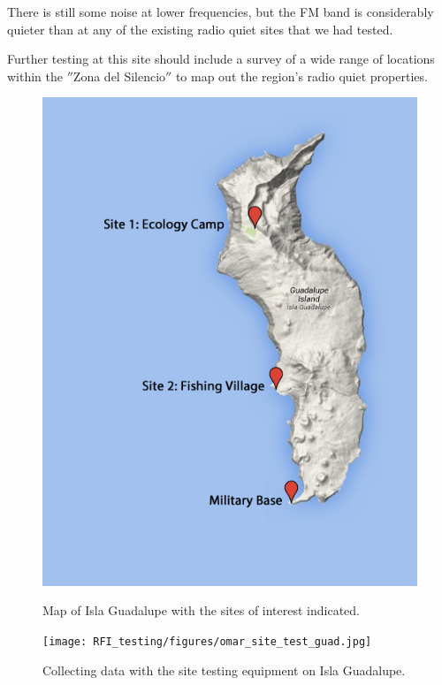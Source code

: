 There is still some noise at lower frequencies, but the FM band is considerably quieter than at any of the existing radio quiet sites that we had tested. 

Further testing at this site should include a survey of a wide range of locations within the $''$Zona del Silencio$''$ to map out the region's radio quiet properties. 

\begin{figure}[htb]
\centering
\begin{minipage}[b]{0.45\textwidth}
\centering
\includegraphics[width=0.95\linewidth]{RFI_testing/figures/isla_guadalupe_site_map.jpg}
\caption{Map of Isla Guadalupe with the sites of interest indicated.}
\label{Fig:guadmap}
\end{minipage}%
\begin{minipage}[b]{0.02\textwidth}
\hspace{1cm}
\end{minipage}%
\begin{minipage}[b]{0.49\textwidth}
\centering
\texttt{[image: RFI\_testing/figures/omar\_site\_test\_guad.jpg]}
\caption{Collecting data with the site testing equipment on Isla Guadalupe.}
\label{Fig:guadsite}
\end{minipage}
\end{figure}


